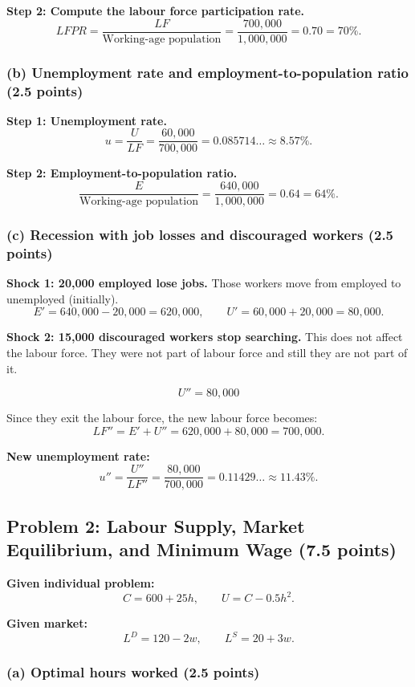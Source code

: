 \documentclass[11pt]{article}
\begin{document}
\textbf{Step 2: Compute the labour force participation rate.}
\[
LFPR = \frac{LF}{\text{Working-age population}}
= \frac{700{,}000}{1{,}000{,}000} = 0.70 = 70\%.
\]

\subsubsection*{(b) Unemployment rate and employment-to-population ratio (2.5 points)}

\textbf{Step 1: Unemployment rate.}
\[
u = \frac{U}{LF} = \frac{60{,}000}{700{,}000}
= 0.085714\ldots \approx 8.57\%.
\]

\textbf{Step 2: Employment-to-population ratio.}
\[
\frac{E}{\text{Working-age population}} = \frac{640{,}000}{1{,}000{,}000}
= 0.64 = 64\%.
\]

\subsubsection*{(c) Recession with job losses and discouraged workers (2.5 points)}

\textbf{Shock 1: 20,000 employed lose jobs.} Those workers move from employed to unemployed (initially).
\[
E' = 640{,}000 - 20{,}000 = 620{,}000,
\qquad
U' = 60{,}000 + 20{,}000 = 80{,}000.
\]

\textbf{Shock 2: 15,000 discouraged workers stop searching.} This does not affect the labour force.  They were not part of labour force and still they are not part of it.

\[
U'' = 80{,}000 
\]

Since they exit the labour force, the new labour force becomes:
\[
LF'' = E' + U'' = 620{,}000 + 80{,}000  = 700{,}000.
\]

\textbf{New unemployment rate:}
\[
u'' = \frac{U''}{LF''} = \frac{80{,}000 }{700{,}000}
= 0.11429\ldots \approx 11.43\%.
\]


\newpage
\subsection*{Problem 2: Labour Supply, Market Equilibrium, and Minimum Wage (7.5 points)}

\textbf{Given individual problem:}
\[
C = 600 + 25h,
\qquad
U = C - 0.5h^2.
\]

\textbf{Given market:}
\[
L^D = 120 - 2w,
\qquad
L^S = 20 + 3w.
\]

\subsubsection*{(a) Optimal hours worked (2.5 points)}
\end{document}
